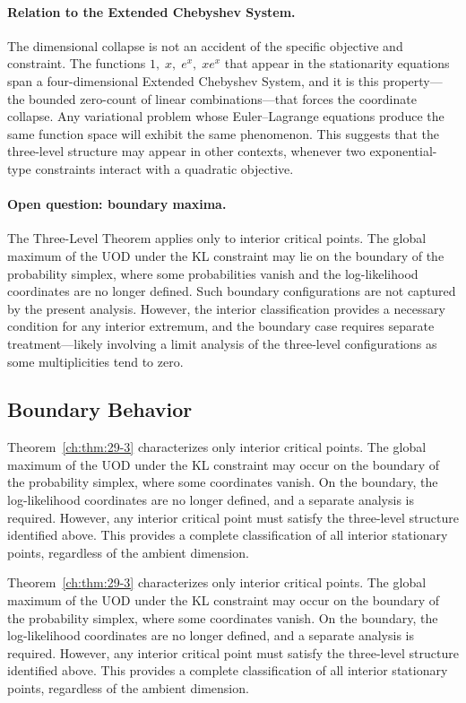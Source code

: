 \paragraph{Relation to the Extended Chebyshev System.}
The dimensional collapse is not an accident of the specific objective
and constraint.  The functions \(1,\;x,\;e^x,\;xe^x\) that appear in the
stationarity equations span a four-dimensional Extended Chebyshev
System, and it is this property---the bounded zero-count of linear
combinations---that forces the coordinate collapse.  Any variational
problem whose Euler--Lagrange equations produce the same function space
will exhibit the same phenomenon.  This suggests that the three-level
structure may appear in other contexts, whenever two exponential-type
constraints interact with a quadratic objective.

\paragraph{Open question: boundary maxima.}
The Three-Level Theorem applies only to interior critical points.
The global maximum of the UOD under the KL constraint may lie on the
boundary of the probability simplex, where some probabilities vanish
and the log-likelihood coordinates are no longer defined.  Such
boundary configurations are not captured by the present analysis.
However, the interior classification provides a necessary condition for
any interior extremum, and the boundary case requires separate
treatment---likely involving a limit analysis of the three-level
configurations as some multiplicities tend to zero.
\subsection{Boundary Behavior}
Theorem~\ref{ch:thm:29-3} characterizes only interior critical points. The global maximum of the UOD under the KL constraint may occur on the boundary of the probability simplex, where some coordinates vanish.
On the boundary, the log-likelihood coordinates are no longer defined, and a separate analysis is required.
However, any interior critical point must satisfy the three-level structure identified above. This provides a complete classification of all interior stationary points, regardless of the ambient dimension.


Theorem~\ref{ch:thm:29-3} characterizes only interior critical points. The global maximum of the UOD under the KL constraint may occur on the boundary of the probability simplex, where some coordinates vanish.
On the boundary, the log-likelihood coordinates are no longer defined, and a separate analysis is required.
However, any interior critical point must satisfy the three-level structure identified above. This provides a complete classification of all interior stationary points, regardless of the ambient dimension.

